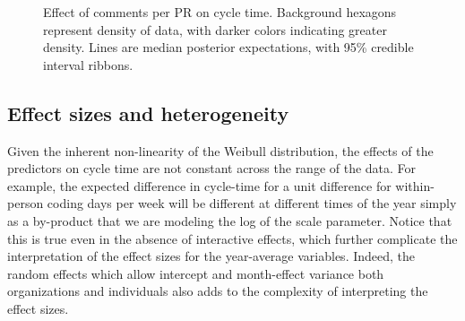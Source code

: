 \documentclass[manuscript,screen,review]{acmart}
\begin{document}
\begin{figure}


\caption[Comments per PR effect on cycle
time]{\label{fig-comments}Effect of comments per PR on cycle time.
Background hexagons represent density of data, with darker colors
indicating greater density. Lines are median posterior expectations,
with 95\% credible interval ribbons.}

\end{figure}%

\subsection{Effect sizes and
heterogeneity}\label{effect-sizes-and-heterogeneity}

Given the inherent non-linearity of the Weibull distribution, the
effects of the predictors on cycle time are not constant across the
range of the data. For example, the expected difference in cycle-time
for a unit difference for within-person coding days per week will be
different at different times of the year simply as a by-product that we
are modeling the log of the scale parameter. Notice that this is true
even in the absence of interactive effects, which further complicate the
interpretation of the effect sizes for the year-average variables.
Indeed, the random effects which allow intercept and month-effect
variance both organizations and individuals also adds to the complexity
of interpreting the effect sizes.
\end{document}
